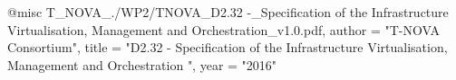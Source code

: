 @misc{ T_NOVA_./WP2/TNOVA_D2.32 -_Specification of the Infrastructure Virtualisation, Management and Orchestration_v1.0.pdf,
       author = "{T-NOVA Consortium}",
       title = "D2.32 - Specification of the Infrastructure Virtualisation, Management and Orchestration ",
       year = "2016" }
